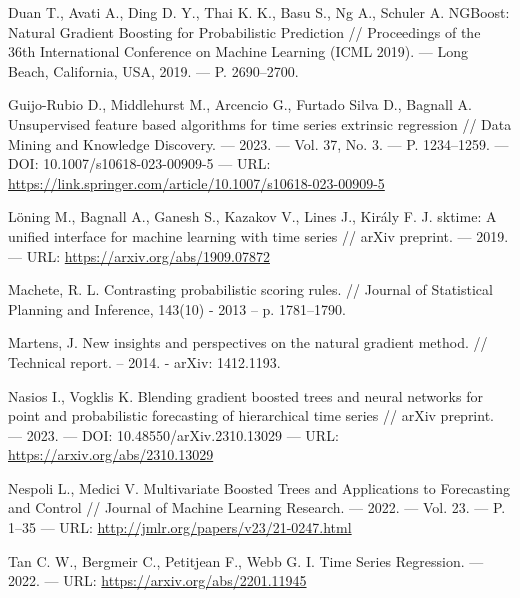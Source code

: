 \documentclass[
]{article}
\begin{document}
{  Duan T., Avati A., Ding D. Y., Thai K. K., Basu S., Ng A., Schuler A. NGBoost: Natural Gradient Boosting for Probabilistic Prediction // Proceedings of the 36th International Conference on Machine Learning (ICML 2019). --- Long Beach, California, USA, 2019. --- P. 2690--2700.

  Guijo-Rubio D., Middlehurst M., Arcencio G., Furtado Silva D., Bagnall A. Unsupervised feature based algorithms for time series extrinsic regression // Data Mining and Knowledge Discovery. --- 2023. --- Vol. 37, No. 3. --- P. 1234--1259. --- DOI: 10.1007/s10618-023-00909-5 --- URL: \url{https://link.springer.com/article/10.1007/s10618-023-00909-5}

  Löning M., Bagnall A., Ganesh S., Kazakov V., Lines J., Király F. J. sktime: A unified interface for machine learning with time series // arXiv preprint. --- 2019. --- URL: \url{https://arxiv.org/abs/1909.07872}

  Machete, R. L. Contrasting probabilistic scoring rules. // Journal of Statistical Planning and Inference, 143(10) - 2013 -- p. 1781--1790.

  Martens, J. New insights and perspectives on the natural gradient method. // Technical report. -- 2014. - arXiv: 1412.1193.

  Nasios I., Vogklis K. Blending gradient boosted trees and neural networks for point and probabilistic forecasting of hierarchical time series // arXiv preprint. --- 2023. --- DOI: 10.48550/arXiv.2310.13029 --- URL: \url{https://arxiv.org/abs/2310.13029}

  Nespoli L., Medici V. Multivariate Boosted Trees and Applications to Forecasting and Control // Journal of Machine Learning Research. --- 2022. --- Vol. 23. --- P. 1--35 --- URL: \url{http://jmlr.org/papers/v23/21-0247.html}

  Tan C. W., Bergmeir C., Petitjean F., Webb G. I. Time Series Regression. --- 2022. --- URL: \url{https://arxiv.org/abs/2201.11945}}
\end{document}
